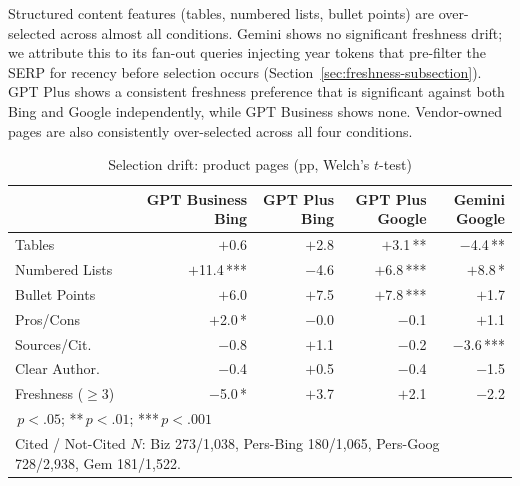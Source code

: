 Structured content features (tables, numbered lists, bullet points) are over-selected across almost all conditions. Gemini shows no significant freshness drift; we attribute this to its fan-out queries injecting year tokens that pre-filter the SERP for recency before selection occurs (Section~\ref{sec:freshness-subsection}). GPT Plus shows a consistent freshness preference that is significant against both Bing and Google independently, while GPT Business shows none. Vendor-owned pages are also consistently over-selected across all four conditions.

\begin{table}[H]
\centering
\caption{Selection drift: product pages (pp, Welch's $t$-test)}
\label{tab:drift-product-pages}
\small
\setlength{\tabcolsep}{8pt}
\begin{tabular}{lrrrr}
\toprule
 & \makecell{GPT Business\\Bing} & \makecell{GPT Plus\\Bing} & \makecell{GPT Plus\\Google} & \makecell{Gemini\\Google} \\
\midrule
Tables              & $+$0.6\phantom{\,***}     & $+$2.8\phantom{\,***}    & $+$3.1\,**\phantom{*}    & $-$4.4\,**\phantom{*}   \\
Numbered Lists      & $+$11.4\,***               & $-$4.6\phantom{\,***}    & $+$6.8\,***              & $+$8.8\,*\phantom{**}   \\
Bullet Points       & $+$6.0\phantom{\,***}      & $+$7.5\phantom{\,***}    & $+$7.8\,***              & $+$1.7\phantom{\,***}   \\
Pros/Cons           & $+$2.0\,*\phantom{**}      & $-$0.0\phantom{\,***}    & $-$0.1\phantom{\,***}    & $+$1.1\phantom{\,***}   \\
Sources/Cit.        & $-$0.8\phantom{\,***}      & $+$1.1\phantom{\,***}    & $-$0.2\phantom{\,***}    & $-$3.6\,***             \\
Clear Author.       & $-$0.4\phantom{\,***}      & $+$0.5\phantom{\,***}    & $-$0.4\phantom{\,***}    & $-$1.5\phantom{\,***}   \\
Freshness ($\geq$3) & $-$5.0\,*\phantom{**}      & $+$3.7\phantom{\,***}    & $+$2.1\phantom{\,***}    & $-$2.2\phantom{\,***}   \\
\bottomrule
\multicolumn{5}{l}{\scriptsize *\,$p<.05$;\; **\,$p<.01$;\; ***\,$p<.001$} \\
\multicolumn{5}{l}{\scriptsize Cited / Not-Cited $N$: Biz 273/1{,}038, Pers-Bing 180/1{,}065, Pers-Goog 728/2{,}938, Gem 181/1{,}522.}
\end{tabular}
\end{table}

